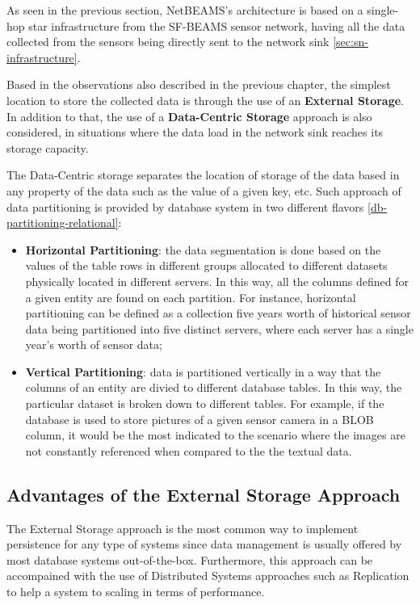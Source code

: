 As seen in the previous section, NetBEAMS's architecture is based on a
single-hop star infrastructure from the SF-BEAMS sensor network, having all
the data collected from the sensors being directly sent to the network sink 
\ref{sec:sn-infrastructure}.

Based in the observations also described in the previous chapter, the simplest
location to store the collected data is through the use of an \textbf{External
Storage}. In addition to that, the use of a \textbf{Data-Centric Storage}
approach is also considered, in situations where the data load in the
network sink reaches its storage capacity.

The Data-Centric storage separates the location of storage of the data based in
any property of the data such as the value of a given key, etc. Such approach
of data partitioning is provided by database system in two different flavors
\ref{db-partitioning-relational}:

\begin{itemize}
  \item \textbf{Horizontal Partitioning}: the data segmentation is done based
  on the values of the table rows in different groups allocated to different
  datasets physically located in different servers. In this way, all the columns
  defined for a given entity are found on each partition. For instance,
  horizontal partitioning can be defined as a collection five years worth of
  historical sensor data being partitioned into five distinct servers, where
  each server has a single year's worth of sensor data;
  \item \textbf{Vertical Partitioning}: data is partitioned vertically in a way
  that the columns of an entity are divied to different database tables. In
  this way, the particular dataset is broken down to different tables. For
  example, if the database is used to store pictures of a given sensor camera 
  in a BLOB column, it would be the most indicated to the scenario where 
  the images are not constantly referenced when compared to the the textual
  data.
\end{itemize} 

\subsection{Advantages of the External Storage Approach}

The External Storage approach is the most common way to implement persistence
for any type of systems since data management is usually offered by most
database systems out-of-the-box. Furthermore, this approach can be accompained
with the use of Distributed Systems approaches such as Replication to help a
system to scaling in terms of performance.

